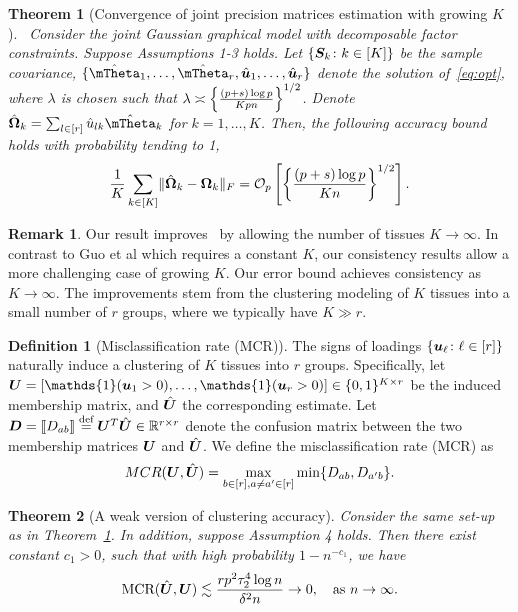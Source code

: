 \documentclass[11pt]{article}
\theoremstyle{plain}
\newtheorem{thm}{Theorem}[section]
\theoremstyle{definition}
\newtheorem{defn}{Definition}
\newtheorem{rmk}{Remark}
\begin{document}
\begin{thm}[Convergence of joint precision matrices estimation with growing $K$]~\label{thm:estimation}
Consider the joint Gaussian graphical model with decomposable factor constraints. Suppose Assumptions 1-3 holds. Let $\{\bm S_k\colon k\in[K]\}$ be the sample covariance, $\{\hat \mTheta_1,\ldots,\hat \mTheta_r, \hat \bmu_1,\ldots,\hat \bmu_r\}$ denote the solution of~\eqref{eq:opt}, where $\lambda$ is chosen such that $\lambda\asymp {\left\{ (p+s)\log p \over Kpn\right\}}^{1/2}$. Denote $\hat \mOmega_k=\sum_{l\in[r]}\hat u_{lk}\hat \mTheta_k$ for $k=1,\ldots,K$. Then, the following accuracy bound holds with probability tending to 1,
\begin{equation}\label{eq:conclusion}
{1\over K} \sum_{k\in[K]}\lVert\hat {\bm \Omega}_k-\bm \Omega_k\rVert_F = \mathcal{O}_p\left[{\left\{ (p+s)\log p \over Kn\right\}}^{1/2} \right].
\end{equation}
\end{thm}
\begin{rmk} Our result improves~\cite{guo2011joint} by allowing the number of tissues $K\to \infty$. In contrast to Guo et al which requires a constant $K$, our consistency results allow a more challenging case of growing $K$. Our error bound achieves consistency  as $K\to\infty$. The improvements stem from the clustering modeling of $K$ tissues into a small number of $r$ groups, where we typically have $K\gg r$.
 \end{rmk}

\begin{defn}[Misclassification rate (MCR)]
The signs of loadings $\{\bm{u}_\ell\colon \ell\in[r]\}$ naturally induce a clustering of $K$ tissues into $r$ groups. Specifically, let $\mU=[\mathds{1}(\bmu_1>0),\ldots,\mathds{1}(\bmu_r>0)]\in\{0,1\}^{K\times r}$ be the induced membership matrix, and $\hat {\bm{U}}$ the corresponding estimate. Let $\bm{D}=\llbracket D_{ab} \rrbracket\stackrel{\text{def}}{=}\bm{U}^T\hat {\bm{U}}\in\mathbb{R}^{r\times r}$ denote the confusion matrix between the two membership matrices $\bm{U}$ and $\hat {\bm{U}}$. We define the misclassification rate (MCR) as
\[
\textup{}{MCR}(\bm{U}, \hat {\bm{U}})=\max_{b\in[r], a\neq a'\in[r]}\min \{D_{ab}, D_{a'b}\}.
\]
\end{defn}


\begin{thm}[A weak version of clustering accuracy]
Consider the same set-up as in Theorem~\ref{thm:estimation}. In addition, suppose Assumption 4 holds. Then there exist constant $c_1>0$, such that with high probability $1-n^{-c_1}$, we have
\[
\text{MCR}(\hat {\bm{U}}, \bm{U}) \lesssim {rp^2\tau_2^4\log n\over \delta^2n} \to 0, \quad \text{as }n\to\infty. 
\]
\end{thm}
\end{document}
